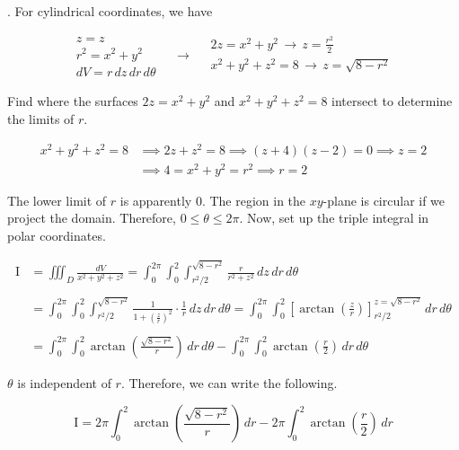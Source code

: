 \documentclass{article}
\begin{document}
\hfill

. For cylindrical coordinates, we have

\[
\begin{array}{c}
z=z\\
r^2=x^2+y^2\\
dV=r\,dz\,dr\,d\theta
\end{array}\quad\rightarrow\quad
\begin{array}{c}
\displaystyle2z=x^2+y^2\,\rightarrow\,z=\frac{r^2}2\\[0.3cm]
x^2+y^2+z^2=8\,\rightarrow\,z=\sqrt{8-r^2}\\
\end{array}
\]

\hfill

\noindent Find where the surfaces $2z=x^2+y^2$ and $x^2+y^2+z^2=8$ intersect to determine the limits of $r$.

\begin{align*}x^2+y^2+z^2=8&\implies 2z + z^2 = 8\implies (z+4)(z-2) = 0\implies z=2\\&\implies4=x^2+y^2=r^2 \implies r=2\end{align*}

\hfill

\noindent The lower limit of $r$ is apparently $0$. The region in the $xy$-plane is circular if we project the domain. Therefore, $0\leq\theta\leq2\pi$. Now, set up the triple integral in polar coordinates.

\begin{align*}\mathrm{I}&=\iiint_D\frac{dV}{x^2+y^2+z^2}=\int_0^{2\pi}\int_0^2\int_{r^2/2}^{\sqrt{8-r^2}}\frac{r}{r^2+z^2}\,dz\,dr\,d\theta\\\\&=\int_0^{2\pi}\int_0^2\int_{r^2/2}^{\sqrt{8-r^2}}\frac{1}{1+\left(\frac zr\right)^2}\cdot\frac1r\,dz\,dr\,d\theta=\int_0^{2\pi}\int_0^2\left[\arctan\left(\frac zr\right)\right]_{r^2/2}^{z=\sqrt{8-r^2}}\,dr\,d\theta\\\\&=\int_0^{2\pi}\int_0^2\arctan\left(\frac{\sqrt{8-r^2}}r\right)\,dr\,d\theta-\int_0^{2\pi}\int_0^2\arctan\left(\frac r2\right)\,dr\,d\theta\end{align*}

\hfill

\noindent $\theta$ is independent of $r$. Therefore, we can write the following.

\begin{equation}
\mathrm{I}=2\pi\int_0^2\arctan\left(\frac{\sqrt{8-r^2}}r\right)\,dr-2\pi\int_0^2\arctan\left(\frac r2\right)\,dr
\end{equation}
\end{document}

